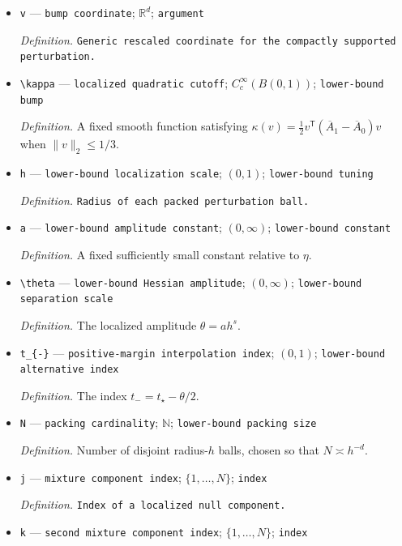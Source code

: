 \documentclass{article}
\begin{document}
\begin{itemize}
  \item \texttt{v} --- \texttt{bump coordinate}; \(\mathbb R^d\); \texttt{argument}
  \par\smallskip\noindent\emph{Definition.} \texttt{Generic rescaled coordinate for the compactly supported perturbation.}
  \item \texttt{\textbackslash{}\allowbreak{}kappa} --- \texttt{localized quadratic cutoff}; \(C_c^\infty(B(0,1))\); \texttt{lower-\allowbreak{}bound bump}
  \par\smallskip\noindent\emph{Definition.} A fixed smooth function satisfying \(\kappa(v)=\tfrac12v^{\mathsf T}(\overline A_1-\overline A_0)v\) when \(\lVert v\rVert_2\le1/3\).
  \item \texttt{h} --- \texttt{lower-\allowbreak{}bound localization scale}; \((0,1)\); \texttt{lower-\allowbreak{}bound tuning}
  \par\smallskip\noindent\emph{Definition.} \texttt{Radius of each packed perturbation ball.}
  \item \texttt{a} --- \texttt{lower-\allowbreak{}bound amplitude constant}; \((0,\infty)\); \texttt{lower-\allowbreak{}bound constant}
  \par\smallskip\noindent\emph{Definition.} A fixed sufficiently small constant relative to \(\eta\).
  \item \texttt{\textbackslash{}\allowbreak{}theta} --- \texttt{lower-\allowbreak{}bound Hessian amplitude}; \((0,\infty)\); \texttt{lower-\allowbreak{}bound separation scale}
  \par\smallskip\noindent\emph{Definition.} The localized amplitude \(\theta=ah^s\).
  \item \texttt{t\_\allowbreak{}\{-\allowbreak{}\}\allowbreak{}} --- \texttt{positive-\allowbreak{}margin interpolation index}; \((0,1)\); \texttt{lower-\allowbreak{}bound alternative index}
  \par\smallskip\noindent\emph{Definition.} The index \(t_{-}=t_\star-\theta/2\).
  \item \texttt{N} --- \texttt{packing cardinality}; \(\mathbb N\); \texttt{lower-\allowbreak{}bound packing size}
  \par\smallskip\noindent\emph{Definition.} Number of disjoint radius-\(h\) balls, chosen so that \(N\asymp h^{-d}\).
  \item \texttt{j} --- \texttt{mixture component index}; \(\{1,\ldots,N\}\); \texttt{index}
  \par\smallskip\noindent\emph{Definition.} \texttt{Index of a localized null component.}
  \item \texttt{k} --- \texttt{second mixture component index}; \(\{1,\ldots,N\}\); \texttt{index}

\end{itemize}
\end{document}
